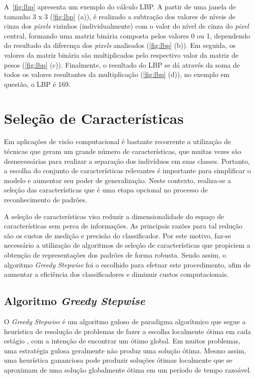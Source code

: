 A~\autoref{fig:lbp} apresenta um exemplo do cálculo LBP. A partir de uma janela de tamanho 3 x 3 (\autoref{fig:lbp} (a)), é realizado a subtração dos valores de níveis de cinza dos \textit{pixels} vizinhos (individualmente) com o valor do nível de cinza do \textit{pixel} central, formando uma matriz binária composta pelos valores 0 ou 1, dependendo do resultado da diferença dos \textit{pixels} analisados (\autoref{fig:lbp} (b)). Em seguida, os valores da matriz binária são multiplicados pelo respectivo valor da matriz de pesos (\autoref{fig:lbp} (c)). Finalmente, o resultado do LBP se dá através da soma de todos os valores resultantes da multiplicação (\autoref{fig:lbp} (d)), no exemplo em questão, o LBP é 169.

\section{Seleção de Características}
\label{sec:selecao}

Em aplicações de visão computacional é bastante recorrente a utilização de técnicas que geram um grande número de características, que muitas vezes são desnecessárias para realizar a separação dos indivíduos em suas classes. Portanto, a escolha do conjunto de características relevantes é importante para simplificar o modelo e aumentar seu poder de generalização. Neste contexto, realiza-se a seleção das características que é uma etapa opcional no processo de reconhecimento de padrões.%

A seleção de características visa reduzir a dimensionalidade do espaço de características sem perca de informações. As principais razões para tal redução são os custos de medição e precisão do classificador. Por este motivo, faz-se necessário a utilização de algoritmos de seleção de características que propiciem a obtenção de representações dos padrões de forma robusta. Sendo assim, o algoritmo \textit{Greedy Stepwise} \cite{ambelu2010comparison} foi o escolhido para efetuar este procedimento, afim de aumentar a eficiência dos classificadores e diminuir custos computacionais.

\subsection{Algoritmo \textit{Greedy Stepwise}}
\label{sec:greedyStepwise}

O \textit{Greedy Stepwise} é um algoritmo guloso de paradigma algorítmico que segue a heurística de resolução de problemas de fazer a escolha localmente ótima em cada estágio \cite{gutin2002traveling}, com a intenção de encontrar um ótimo global. Em muitos problemas, uma estratégia gulosa geralmente não produz uma solução ótima. Mesmo assim, uma heurística gananciosa pode produzir soluções ótimas localmente que se aproximam de uma solução globalmente ótima em um período de tempo razoável.

